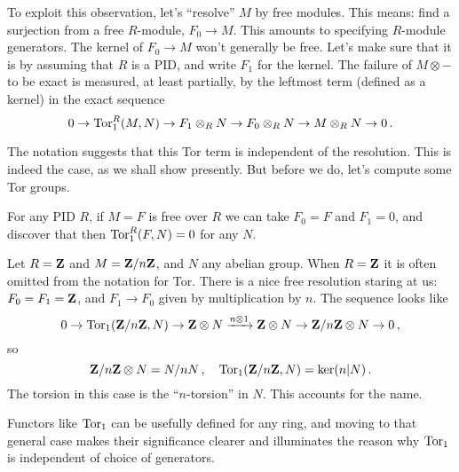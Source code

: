 To exploit this observation, let's ``resolve'' $M$ by free modules. This means:
find a surjection from a free $R$-module, $F_0\to M$. This amounts to specifying $R$-module generators. The kernel of $F_0\to M$ won't generally be free. 
Let's make sure that it is by assuming that $R$ is a PID, and write $F_1$ for
the kernel. The failure of $M\otimes-$ to be exact is measured, at least
partially, by the leftmost term (defined as a kernel) in the exact sequence
\[
0\to\operatorname{Tor}_1^R(M,N)\to F_1\otimes_RN\to F_0\otimes_RN\to M\otimes_RN\to0\,.
\]

The notation suggests that this Tor term is independent of the resolution. 
This is indeed the case, as we shall show presently. But before we do, let's 
compute some Tor groups. 

\begin{example} 
For any PID $R$, if $M=F$ is free over $R$ we can take $F_0=F$
and $F_1=0$, and discover that then $\operatorname{Tor}_1^R(F,N)=0$ for any $N$. 
\end{example}
\begin{example} 
Let $R=\mathbf Z$ and $M=\mathbf Z/n\mathbf Z$, and $N$ any abelian group. When $R=\mathbf Z$ it is often
omitted from the notation for Tor.
There is a nice free resolution staring at us:
$F_0=F_1=\mathbf Z$, and $F_1\to F_0$ given by multiplication by $n$. The sequence
looks like 
\[
0\to\operatorname{Tor}_1(\mathbf Z/n\mathbf Z,N)\to\mathbf Z\otimes N\xrightarrow{n\otimes1}\mathbf Z\otimes N\to
\mathbf Z/n\mathbf Z\otimes N\to 0\,,
\]
so
\[
\mathbf Z/n\mathbf Z\otimes N=N/nN\,,\quad\operatorname{Tor}_1(\mathbf Z/n\mathbf Z,N)=\ker(n|N)\,.
\]
The torsion in this case is the ``$n$-torsion'' in $N$. This accounts for
the name.
\end{example}

Functors like $\operatorname{Tor}_1$ can be usefully defined for any ring, and moving to that
general case makes their significance clearer and illuminates the reason why 
$\operatorname{Tor}_1$ is independent of choice of generators. 

